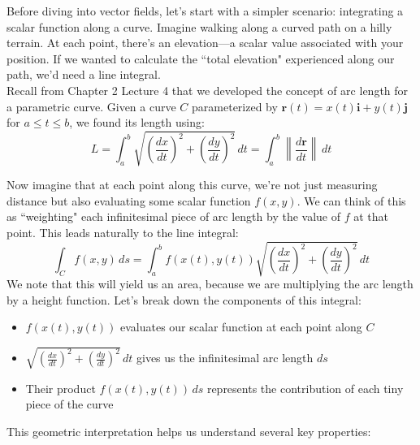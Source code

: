 \noindent Before diving into vector fields, let's start with a simpler scenario: integrating a scalar function along a curve. Imagine walking along a curved path on a hilly terrain. At each point, there's an elevation—a scalar value associated with your position. If we wanted to calculate the ``total elevation" experienced along our path, we'd need a line integral. \\

\noindent Recall from Chapter 2 Lecture 4 that we developed the concept of arc length for a parametric curve. Given a curve $C$ parameterized by $\mathbf{r}(t) = x(t)\mathbf{i} + y(t)\mathbf{j}$ for $a \leq t \leq b$, we found its length using:
\[
L = \int_a^b \sqrt{\left(\frac{dx}{dt}\right)^2 + \left(\frac{dy}{dt}\right)^2}\,dt = \int_a^b \left\|\frac{d\mathbf{r}}{dt}\right\|\,dt
\]

\noindent Now imagine that at each point along this curve, we're not just measuring distance but also evaluating some scalar function $f(x,y)$. We can think of this as ``weighting" each infinitesimal piece of arc length by the value of $f$ at that point. This leads naturally to the line integral:
\[
\int_C f(x,y)\,ds = \int_a^b f(x(t),y(t))\sqrt{\left(\frac{dx}{dt}\right)^2 + \left(\frac{dy}{dt}\right)^2}\,dt
\]
\noindent We note that this will yield us an area, because we are multiplying the arc length by a height function. Let's break down the components of this integral:
\begin{itemize}
    \item $f(x(t),y(t))$ evaluates our scalar function at each point along $C$
    \item $\sqrt{\left(\frac{dx}{dt}\right)^2 + \left(\frac{dy}{dt}\right)^2}\,dt$ gives us the infinitesimal arc length $ds$
    \item Their product $f(x(t),y(t))\,ds$ represents the contribution of each tiny piece of the curve
\end{itemize}

\noindent This geometric interpretation helps us understand several key properties:

